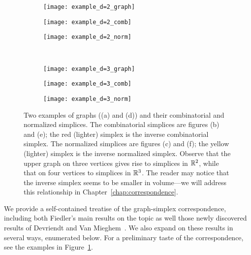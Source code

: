 	\begin{figure}
	\centering
	\begin{subfigure}[b]{0.32\textwidth}
		\centering
		\texttt{[image: example\_d=2\_graph]}
		\vspace{0.2cm}
		\subcaption{}
	\end{subfigure}
	\begin{subfigure}[b]{0.32\textwidth}
		\centering
		\texttt{[image: example\_d=2\_comb]}
		\subcaption{}
	\end{subfigure}
	\begin{subfigure}[b]{0.32\textwidth}
		\centering
		\texttt{[image: example\_d=2\_norm]}
		\subcaption{}
	\end{subfigure}
	\\ 
	\begin{subfigure}[b]{0.32\textwidth}
		\centering
		\texttt{[image: example\_d=3\_graph]}
		\vspace{0.2cm}
		\subcaption{}
	\end{subfigure}
	\begin{subfigure}[b]{0.32\textwidth}
		\centering
		\texttt{[image: example\_d=3\_comb]}
		\subcaption{}
	\end{subfigure}
	\begin{subfigure}[b]{0.32\textwidth}
		\centering
		\texttt{[image: example\_d=3\_norm]}
		\subcaption{}
	\end{subfigure}
	\caption{Two examples of graphs ((a) and (d)) and their combinatorial and normalized simplices.  The combinatorial simplices are figures (b) and (e); the red (lighter) simplex is the inverse combinatorial simplex. The normalized simplices are figures (c) and (f); the yellow (lighter) simplex is the inverse normalized simplex. Observe that the upper graph on three vertices gives rise to simplices in $\mathbb{R}^2$, while that on  four vertices to simplices in $\mathbb{R}^3$. The reader may notice that the  inverse simplex seems to  be smaller in volume---we will address this relationship in Chapter~\ref{chap:correspondence}.   }
	\label{fig:correspondence_examples}
\end{figure}



We provide a self-contained treatise of the graph-simplex correspondence, including both Fiedler's main results  on the topic as well those newly discovered results of Devriendt and Van Mieghem~\cite{devriendt2018simplex}. We also expand on these results in several ways,  enumerated  below. For a preliminary taste of the correspondence, see the examples  in Figure~\ref{fig:correspondence_examples}. 




